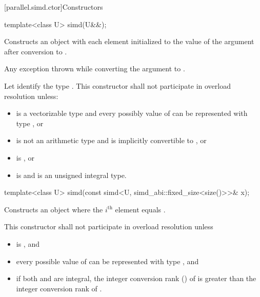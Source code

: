 [parallel.simd.ctor]{Constructors}

\begin{itemdecl}
template<class U> simd(U&&);
\end{itemdecl}

\begin{itemdescr}
  \pnum\effects
  Constructs an object with each element initialized to the value of the argument after conversion to .

  \pnum\throws
  Any exception thrown while converting the argument to .

  \pnum\remarks
  Let  identify the type . This constructor shall not participate in overload resolution unless:
  \begin{itemize}
    \item {} is a vectorizable type and every possibly value of  can be represented with type , or
    \item {} is not an arithmetic type and is implicitly convertible to , or
    \item {} is , or
    \item {} is  and  is an unsigned integral type.
  \end{itemize}

\end{itemdescr}

\begin{itemdecl}
template<class U> simd(const simd<U, simd_abi::fixed_size<size()>>& x);
\end{itemdecl}

\begin{itemdescr}
  \pnum\effects
  Constructs an object where the $i^\text{th}$ element equals  \foralli.

  \pnum\remarks
  This constructor shall not participate in overload resolution unless
  \begin{itemize}
    \item {} is , and
    \item every possible value of  can be represented with type , and
    \item if both  and  are integral, the integer conversion rank () of  is greater than the integer conversion rank of .
  \end{itemize}
\end{itemdescr}

